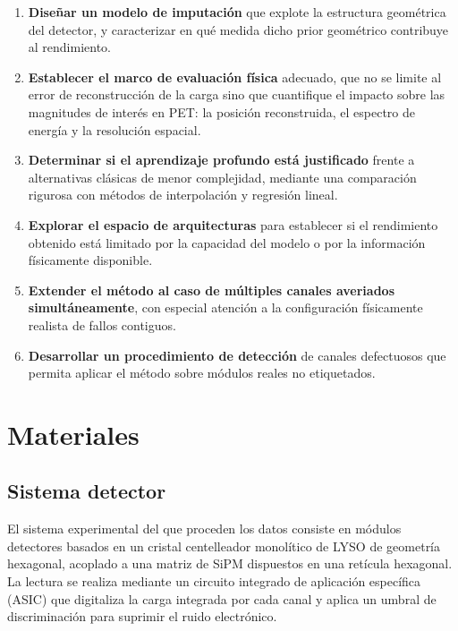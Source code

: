 \begin{enumerate}
    \item \textbf{Diseñar un modelo de imputación} que explote la estructura geométrica del
    detector, y caracterizar en qué medida dicho prior geométrico contribuye al rendimiento.

    \item \textbf{Establecer el marco de evaluación física} adecuado, que no se limite al error de
    reconstrucción de la carga sino que cuantifique el impacto sobre las magnitudes de interés en
    PET: la posición reconstruida, el espectro de energía y la resolución espacial.

    \item \textbf{Determinar si el aprendizaje profundo está justificado} frente a alternativas
    clásicas de menor complejidad, mediante una comparación rigurosa con métodos de interpolación
    y regresión lineal.

    \item \textbf{Explorar el espacio de arquitecturas} para establecer si el rendimiento obtenido
    está limitado por la capacidad del modelo o por la información físicamente disponible.

    \item \textbf{Extender el método al caso de múltiples canales averiados simultáneamente},
    con especial atención a la configuración físicamente realista de fallos contiguos.

    \item \textbf{Desarrollar un procedimiento de detección} de canales defectuosos que permita
    aplicar el método sobre módulos reales no etiquetados.
\end{enumerate}


\section{Materiales}
\label{sec:materiales}

\subsection{Sistema detector}
\label{subsec:sistema-detector}

El sistema experimental del que proceden los datos consiste en módulos detectores basados en un
cristal centelleador monolítico de LYSO de geometría hexagonal, acoplado a una matriz de SiPM
dispuestos en una retícula hexagonal. La lectura se realiza mediante un circuito integrado de
aplicación específica (ASIC) que digitaliza la carga integrada por cada canal y aplica un umbral de
discriminación para suprimir el ruido electrónico.

